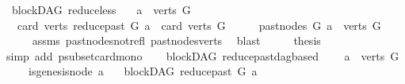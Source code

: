 \begin{isabellebody}
\isamarkupfalse%
%
\endisatagproof
{\isafoldproof}%
%
\isadelimproof
\isanewline
%
\endisadelimproof
\isanewline
{}\isamarkupfalse%
\ {\isacharparenleft}{\kern0pt}\ blockDAG{\isacharparenright}{\kern0pt}\ reduce{\isacharunderscore}{\kern0pt}less{\isacharcolon}{\kern0pt}\isanewline
\ \ \ {\isachardoublequoteopen}a\ {\isasymin}\ verts\ G{\isachardoublequoteclose}\isanewline
\ \ \ {\isachardoublequoteopen}card\ {\isacharparenleft}{\kern0pt}verts\ {\isacharparenleft}{\kern0pt}reduce{\isacharunderscore}{\kern0pt}past\ G\ a{\isacharparenright}{\kern0pt}{\isacharparenright}{\kern0pt}\ {\isacharless}{\kern0pt}\ card\ {\isacharparenleft}{\kern0pt}verts\ G{\isacharparenright}{\kern0pt}{\isachardoublequoteclose}\isanewline
%
\isadelimproof
%
\endisadelimproof
%
\isatagproof
{}\isamarkupfalse%
\ {\isacharminus}{\kern0pt}\isanewline
\ \ \isamarkupfalse%
\ {\isachardoublequoteopen}past{\isacharunderscore}{\kern0pt}nodes\ G\ a\ {\isasymsubset}\ verts\ G{\isachardoublequoteclose}\isanewline
\ \ \ \ \isamarkupfalse%
\ assms{\isacharparenleft}{\kern0pt}{}{\isacharparenright}{\kern0pt}\ past{\isacharunderscore}{\kern0pt}nodes{\isacharunderscore}{\kern0pt}not{\isacharunderscore}{\kern0pt}refl\ past{\isacharunderscore}{\kern0pt}nodes{\isacharunderscore}{\kern0pt}verts\ \isamarkupfalse%
\ blast\isanewline
\ \ \isamarkupfalse%
\ \isamarkupfalse%
\ {\isacharquery}{\kern0pt}thesis\isanewline
\ \ \ \ \isamarkupfalse%
\ {\isacharparenleft}{\kern0pt}simp\ add{\isacharcolon}{\kern0pt}\ psubset{\isacharunderscore}{\kern0pt}card{\isacharunderscore}{\kern0pt}mono{\isacharparenright}{\kern0pt}\isanewline
{}\isamarkupfalse%
%
\endisatagproof
{\isafoldproof}%
%
\isadelimproof
\ \isanewline
%
\endisadelimproof
\isanewline
\isanewline
\isanewline
\isanewline
\isanewline
\isanewline
{}\isamarkupfalse%
\ {\isacharparenleft}{\kern0pt}\ blockDAG{\isacharparenright}{\kern0pt}\ reduce{\isacharunderscore}{\kern0pt}past{\isacharunderscore}{\kern0pt}dagbased{\isacharcolon}{\kern0pt}\isanewline
\ \ \ {\isachardoublequoteopen}\ a\ {\isasymin}\ verts\ G{\isachardoublequoteclose}\isanewline
\ \ \ \ \ {\isachardoublequoteopen}{\isasymnot}is{\isacharunderscore}{\kern0pt}genesis{\isacharunderscore}{\kern0pt}node\ a{\isachardoublequoteclose}\isanewline
\ \ \ {\isachardoublequoteopen}blockDAG\ {\isacharparenleft}{\kern0pt}reduce{\isacharunderscore}{\kern0pt}past\ G\ a{\isacharparenright}{\kern0pt}{\isachardoublequoteclose}\isanewline

\end{isabellebody}
